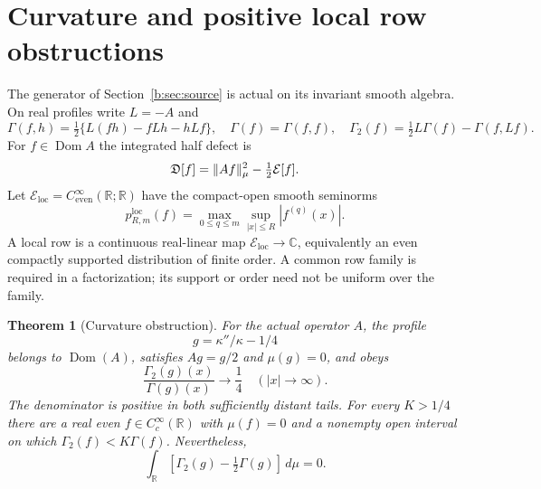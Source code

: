 \documentclass[11pt,a4paper]{article}
\numberwithin{equation}{section}
\newtheorem{theorem}{Theorem}[section]
\theoremstyle{definition}\newtheorem{definition}[theorem]{Definition}
\theoremstyle{remark}\newtheorem{remark}[theorem]{Remark}
\newcommand{\R}{\mathbb R}\newcommand{\C}{\mathbb C}\newcommand{\N}{\mathbb N}
\newcommand{\E}{\mathcal E}\newcommand{\D}{\mathcal D}
\newcommand{\dom}{\operatorname{Dom}}\newcommand{\Var}{\operatorname{Var}}
\newcommand{\Eloc}{\mathcal E_{\mathrm{loc}}}\newcommand{\Def}{\mathfrak D}
\begin{document}
\section{Curvature and positive local row obstructions}\label{sec:obstructions}
The generator of Section~\ref{b:sec:source} is actual on its invariant smooth algebra. On real profiles write $L=-A$ and
\begin{equation}\label{b:eq:carredef}
 \Gamma(f,h)=\tfrac12\{L(fh)-fLh-hLf\},\quad
 \Gamma(f)=\Gamma(f,f),\quad \Gamma_2(f)=\tfrac12L\Gamma(f)-\Gamma(f,Lf).
\end{equation}
For $f\in\dom A$ the integrated half defect is
\begin{equation}\label{b:eq:defect}
 \Def[f]=\norm{Af}_\mu^2-\tfrac12\E[f].
\end{equation}
Let $\Eloc=C^\infty_{\mathrm{even}}(\R;\R)$ have the compact-open smooth seminorms
\begin{equation}\label{b:eq:localtopology}
 p^{\mathrm{loc}}_{R,m}(f)=\max_{0\le q\le m}\sup_{|x|\le R}|f^{(q)}(x)|.
\end{equation}
A local row is a continuous real-linear map $\Eloc\to\C$, equivalently an even compactly supported distribution of finite order. A common row family is required in a factorization; its support or order need not be uniform over the family.


\begin{theorem}[Curvature obstruction]\label{b:thm:maincurvature}
For the actual operator $A$, the profile
\[
 g=\kappa''/\kappa-1/4
\]
belongs to $\dom(A)$, satisfies $Ag=g/2$ and $\mu(g)=0$, and obeys
\begin{equation}\label{b:eq:mainquarter}
 \frac{\Gamma_2(g)(x)}{\Gamma(g)(x)}\longrightarrow\frac14
 \quad(|x|\to\infty).
\end{equation}
The denominator is positive in both sufficiently distant tails. For every $K>1/4$ there are a real even $f\in C_c^\infty(\R)$ with $\mu(f)=0$ and a nonempty open interval on which $\Gamma_2(f)<K\Gamma(f)$. Nevertheless,
\[
 \int_\R[\Gamma_2(g)-\tfrac12\Gamma(g)]\,d\mu=0.
\]
\end{theorem}
\end{document}
